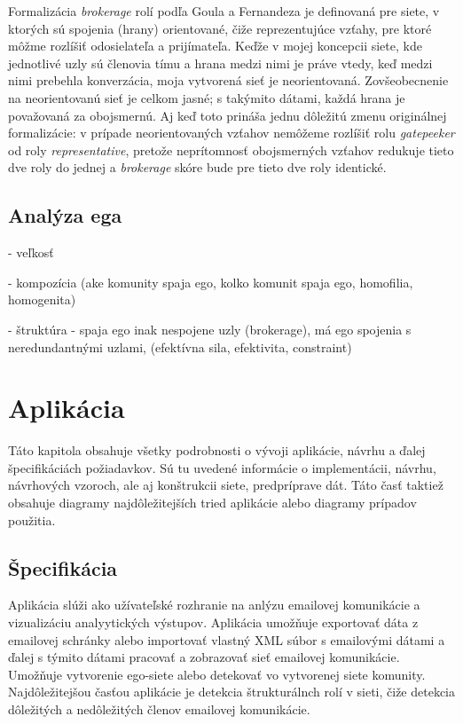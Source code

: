 \documentclass[slovak,master,public,dept460,male,cpdeclaration,oneside]{diploma}
\begin{document}
Formalizácia \textit{brokerage} rolí podľa Goula a Fernandeza je definovaná pre siete, v ktorých sú spojenia (hrany) orientované, čiže reprezentujúce vzťahy, pre ktoré môžme rozlíšiť odosielateľa a prijímateľa. Keďže v mojej koncepcii siete, kde jednotlivé uzly sú členovia tímu a hrana medzi nimi je práve vtedy, keď medzi nimi prebehla konverzácia, moja vytvorená sieť je neorientovaná. Zovšeobecnenie na neorientovanú sieť je celkom jasné; s takýmito dátami, každá hrana je považovaná za obojsmernú. Aj keď toto prináša jednu dôležitú zmenu originálnej formalizácie: v prípade neorientovaných vzťahov nemôžeme rozlíšiť rolu \textit{gatepeeker} od roly \textit{representative}, pretože neprítomnosť obojsmerných vzťahov redukuje tieto dve roly do jednej a \textit{brokerage} skóre bude pre tieto dve roly identické. \cite{19}

\subsection{Analýza ega}

- veľkosť

- kompozícia (ake komunity spaja ego, kolko komunit spaja ego, homofilia, homogenita)

- štruktúra - spaja ego inak nespojene uzly (brokerage), má ego spojenia s neredundantnými uzlami, (efektívna sila, efektivita, constraint)


\section{Aplikácia}
Táto kapitola obsahuje všetky podrobnosti o vývoji aplikácie, návrhu a ďalej špecifikáciách požiadavkov. Sú tu uvedené informácie o implementácii, návrhu, návrhových vzoroch, ale aj  konštrukcii siete, predpríprave dát. Táto časť taktiež obsahuje diagramy najdôležitejších tried aplikácie alebo diagramy prípadov použitia. 


\subsection{Špecifikácia}
Aplikácia slúži ako užívateľské rozhranie na anlýzu emailovej komunikácie a vizualizáciu analyytických výstupov. Aplikácia umožňuje exportovať dáta z emailovej schránky alebo importovať vlastný XML súbor s emailovými dátami a ďalej s týmito dátami pracovať a zobrazovať sieť emailovej komunikácie. Umožňuje vytvorenie ego-siete alebo detekovať vo vytvorenej siete komunity. Najdôležitejšou časťou aplikácie je detekcia štrukturálnch rolí v sieti, čiže detekcia dôležitých a nedôležitých členov emailovej komunikácie. 
\end{document}
